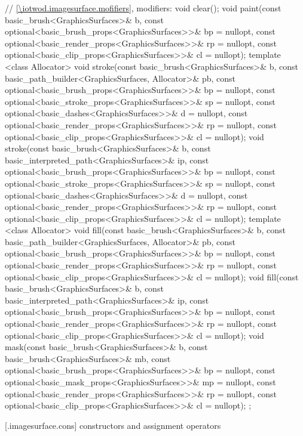 \begin{codeblock}
{{    // \ref{\iotwod.imagesurface.mofifiers}, modifiers:
    void clear();
    void paint(const basic_brush<GraphicsSurfaces>& b,
      const optional<basic_brush_props<GraphicsSurfaces>>& bp = nullopt,
      const optional<basic_render_props<GraphicsSurfaces>>& rp = nullopt,
      const optional<basic_clip_props<GraphicsSurfaces>>& cl = nullopt);
    template <class Allocator>
    void stroke(const basic_brush<GraphicsSurfaces>& b,
      const basic_path_builder<GraphicsSurfaces, Allocator>& pb,
      const optional<basic_brush_props<GraphicsSurfaces>>& bp = nullopt,
      const optional<basic_stroke_props<GraphicsSurfaces>>& sp = nullopt,
      const optional<basic_dashes<GraphicsSurfaces>>& d = nullopt,
      const optional<basic_render_props<GraphicsSurfaces>>& rp = nullopt,
      const optional<basic_clip_props<GraphicsSurfaces>>& cl = nullopt);
    void stroke(const basic_brush<GraphicsSurfaces>& b,
      const basic_interpreted_path<GraphicsSurfaces>& ip,
      const optional<basic_brush_props<GraphicsSurfaces>>& bp = nullopt,
      const optional<basic_stroke_props<GraphicsSurfaces>>& sp = nullopt,
      const optional<basic_dashes<GraphicsSurfaces>>& d = nullopt,
      const optional<basic_render_props<GraphicsSurfaces>>& rp = nullopt,
      const optional<basic_clip_props<GraphicsSurfaces>>& cl = nullopt);
    template <class Allocator>
    void fill(const basic_brush<GraphicsSurfaces>& b,
      const basic_path_builder<GraphicsSurfaces, Allocator>& pb,
      const optional<basic_brush_props<GraphicsSurfaces>>& bp = nullopt,
      const optional<basic_render_props<GraphicsSurfaces>>& rp = nullopt,
      const optional<basic_clip_props<GraphicsSurfaces>>& cl = nullopt);
    void fill(const basic_brush<GraphicsSurfaces>& b,
      const basic_interpreted_path<GraphicsSurfaces>& ip,
      const optional<basic_brush_props<GraphicsSurfaces>>& bp = nullopt,
      const optional<basic_render_props<GraphicsSurfaces>>& rp = nullopt,
      const optional<basic_clip_props<GraphicsSurfaces>>& cl = nullopt);
    void mask(const basic_brush<GraphicsSurfaces>& b,
      const basic_brush<GraphicsSurfaces>& mb,
      const optional<basic_brush_props<GraphicsSurfaces>>& bp = nullopt,
      const optional<basic_mask_props<GraphicsSurfaces>>& mp = nullopt,
      const optional<basic_render_props<GraphicsSurfaces>>& rp = nullopt,
      const optional<basic_clip_props<GraphicsSurfaces>>& cl = nullopt);
  };
}
\end{codeblock}

 [\iotwod.imagesurface.cons] { constructors and assignment operators}

